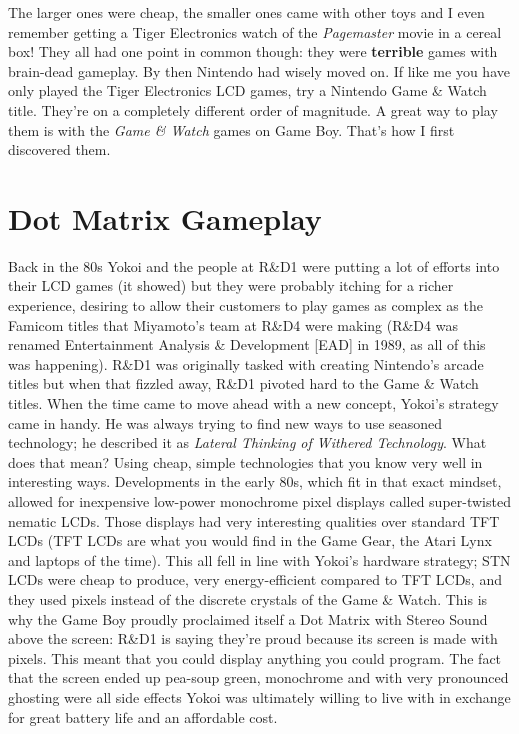 \documentclass{book}
\begin{document}
\FloatBarrier\vspace{\baselineskip}\centering
\begin{minipage}{0.45\linewidth}\end{minipage}\vspace{2pt}
\begin{minipage}{0.45\linewidth}\end{minipage}
\par\justifying
The larger ones were cheap, the smaller ones came with other toys and I even remember getting a Tiger Electronics watch of the \emph{Pagemaster} movie in a cereal box! They all had one point in common though: they were \textbf{terrible} games with brain-dead gameplay. By then Nintendo had wisely moved on. If like me you have only played the Tiger Electronics LCD games, try a Nintendo Game \& Watch title. They’re on a completely different order of magnitude. A great way to play them is with the \emph{Game \& Watch} games on Game Boy. That’s how I first discovered them.\par
\FloatBarrier\section*{Dot Matrix Gameplay}
Back in the 80s Yokoi and the people at R\&D1 were putting a lot of efforts into their LCD games (it showed) but they were probably itching for a richer experience, desiring to allow their customers to play games as complex as the Famicom titles that Miyamoto’s team at R\&D4 were making (R\&D4 was renamed Entertainment Analysis \& Development [EAD] in 1989, as all of this was happening). R\&D1 was originally tasked with creating Nintendo’s arcade titles but when that fizzled away, R\&D1 pivoted hard to the Game \& Watch titles. When the time came to move ahead with a new concept, Yokoi’s strategy came in handy. He was always trying to find new ways to use seasoned technology; he described it as \emph{Lateral Thinking of Withered Technology}. What does that mean? Using cheap, simple technologies that you know very well in interesting ways. Developments in the early 80s, which fit in that exact mindset, allowed for inexpensive low-power monochrome pixel displays called super-twisted nematic LCDs. Those displays had very interesting qualities over standard TFT LCDs (TFT LCDs are what you would find in the Game Gear, the Atari Lynx and laptops of the time). This all fell in line with Yokoi’s hardware strategy; STN LCDs were cheap to produce, very energy-efficient compared to TFT LCDs, and they used pixels instead of the discrete crystals of the Game \& Watch. This is why the Game Boy proudly proclaimed itself a Dot Matrix with Stereo Sound above the screen: R\&D1 is saying they’re proud because its screen is made with pixels. This meant that you could display anything you could program. The fact that the screen ended up pea-soup green, monochrome and with very pronounced ghosting were all side effects Yokoi was ultimately willing to live with in exchange for great battery life and an affordable cost.\par
\end{document}
